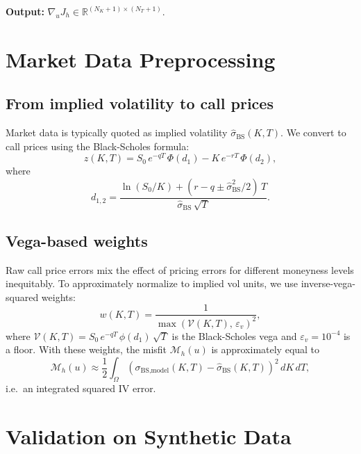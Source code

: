 \documentclass[11pt, a4paper]{article}
\newcommand{\R}{\mathbb{R}}
\newcommand{\Omg}{\Omega}
\theoremstyle{definition}
\theoremstyle{plain}
\begin{document}
\textbf{Output:} $\nabla_u J_h \in \R^{(N_K+1)\times(N_T+1)}$.

\section{Market Data Preprocessing}

\subsection{From implied volatility to call prices}

Market data is typically quoted as implied volatility $\hat{\sigma}_\text{BS}(K,T)$.
We convert to call prices using the Black-Scholes formula:
\begin{equation}\label{eq:bs}
  z(K,T)
  = S_0\,e^{-qT}\,\Phi(d_1)
    - K\,e^{-rT}\,\Phi(d_2),
\end{equation}
where
\[
  d_{1,2} = \frac{\ln(S_0/K) + (r - q \pm \hat{\sigma}_\text{BS}^2/2)\,T}
                 {\hat{\sigma}_\text{BS}\,\sqrt{T}}.
\]

\subsection{Vega-based weights}

Raw call price errors mix the effect of pricing errors for different moneyness
levels inequitably. To approximately normalize to implied vol units, we use
inverse-vega-squared weights:
\begin{equation}\label{eq:vega_weights}
  w(K,T) = \frac{1}{\max(\mathcal{V}(K,T),\, \varepsilon_v)^2},
\end{equation}
where $\mathcal{V}(K,T) = S_0\,e^{-qT}\,\phi(d_1)\,\sqrt{T}$ is the
Black-Scholes vega and $\varepsilon_v = 10^{-4}$ is a floor.
With these weights, the misfit $\mathcal{M}_h(u)$ is approximately equal to
\[
  \mathcal{M}_h(u)
  \approx
  \frac{1}{2}\int_\Omg (\sigma_\text{BS,model}(K,T) - \hat{\sigma}_\text{BS}(K,T))^2 \,dK\,dT,
\]
i.e.\ an integrated squared IV error.

\section{Validation on Synthetic Data}
\end{document}
